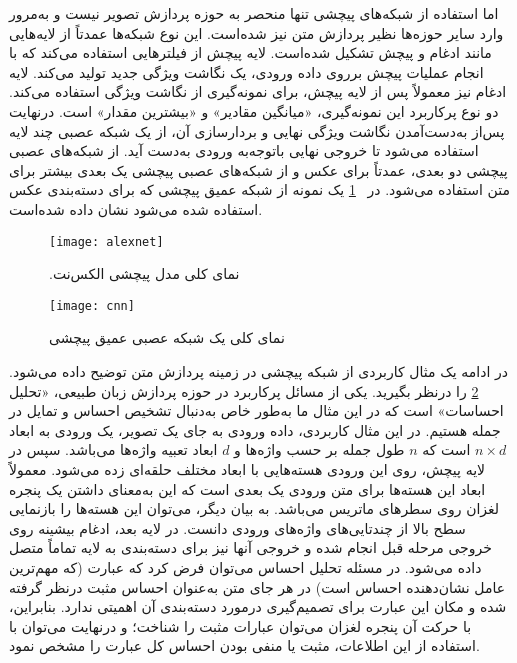   
 اما استفاده از شبکه‌های
 پیچشی تنها منحصر به حوزه پردازش تصویر نیست و به‌مرور وارد سایر حوزه‌ها نظیر پردازش متن نیز شده‌است.
 این نوع شبکه‌ها عمدتاً از لایه‌هایی مانند ادغام و پیچش تشکیل شده‌است. لایه پیچش از فیلترهایی استفاده می‌کند که با
 انجام عملیات پیچش برروی داده ورودی، یک نگاشت ویژگی جدید تولید می‌کند. لایه ادغام نیز معمولاً پس از لایه پیچش،
 برای نمونه‌گیری از نگاشت ویژگی استفاده می‌کند. دو نوع پرکاربرد این نمونه‌گیری، «میانگین مقادیر» و «بیشترین مقدار» است. درنهایت پس‌از به‌دست‌آمدن نگاشت ویژگی نهایی و بردارسازی آن، از یک شبکه عصبی چند لایه استفاده می‌شود تا خروجی
 نهایی باتوجه‌به ورودی به‌دست آید. از شبکه‌های عصبی پیچشی دو بعدی، عمدتاً برای عکس و از شبکه‌های عصبی پیچشی یک
 بعدی بیشتر برای متن استفاده می‌شود. در \figurename~\ref{fig.alexnet} یک نمونه از شبکه عمیق پیچشی  که برای دسته‌بندی عکس استفاده شده می‌شود نشان داده شده‌است.

\begin{figure}[!h]
\texttt{[image: alexnet]}
\centering
\caption{.نمای کلی مدل پیچشی الکس‌نت \citep{krizhevsky2012imagenet}}
\label{fig.alexnet}
\end{figure}

\vspace{3mm}

\begin{figure}[!h]
\texttt{[image: cnn]}
\centering
\caption{نمای کلی یک شبکه عصبی عمیق پیچشی \citep{le2017convolutional}}
\label{fig.sentimentAnalyzing}
\end{figure}

در ادامه یک مثال کاربردی از شبکه پیچشی در زمینه پردازش متن توضیح داده می‌شود. \figurename~\ref{fig.sentimentAnalyzing} را درنظر بگیرید. یکی از مسائل  پرکاربرد در حوزه پردازش زبان طبیعی، «تحلیل احساسات» است که در این مثال ما به‌طور خاص  به‌دنبال تشخیص احساس و تمایل در جمله  هستیم. در این مثال کاربردی، داده ورودی به جای یک تصویر، یک ورودی به ابعاد  $n \times d$  است که $n$ طول جمله بر حسب واژه‌ها و $d$ ابعاد تعبیه واژه‌ها می‌باشد. سپس در لایه پیچش، روی این ورودی هسته‌هایی با ابعاد مختلف حلقه‌ای زده می‌شود. معمولاً ابعاد این هسته‌ها برای متن ورودی یک بعدی است که این به‌معنای داشتن یک پنجره لغزان روی سطرهای ماتریس می‌باشد. به بیان دیگر، می‌توان این هسته‌ها را بازنمایی سطح بالا از چندتایی‌های واژه‌های ورودی دانست. در لایه بعد، ادغام بیشینه روی خروجی مرحله قبل  انجام شده و خروجی آنها نیز برای دسته‌بندی به لایه تماماً متصل داده می‌شود. در مسئله تحلیل احساس می‌توان فرض کرد که عبارت  (که مهم‌ترین عامل نشان‌دهنده احساس است)  در هر جای متن  به‌عنوان احساس مثبت درنظر گرفته شده و مکان این عبارت برای تصمیم‌گیری درمورد دسته‌بندی آن اهمیتی ندارد. بنابراین، با حرکت آن پنجره لغزان می‌توان عبارات مثبت را شناخت؛ و درنهایت می‌توان با استفاده از این اطلاعات، مثبت یا منفی بودن احساس کل عبارت را مشخص نمود.


